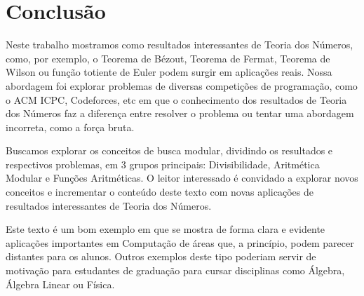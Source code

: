 
\chapter{Conclusão} %

\label{Chapter5} %


Neste trabalho mostramos como resultados interessantes de Teoria dos
Números, como, por exemplo, o Teorema de Bézout,  Teorema de Fermat,
Teorema de Wilson ou função totiente de Euler podem surgir em
aplicações reais. Nossa abordagem foi explorar problemas de diversas
competições de programação, como o ACM ICPC, Codeforces, etc  em que o
conhecimento dos resultados de Teoria dos Números faz a diferença
entre resolver o problema ou tentar uma abordagem incorreta, como a
força bruta.

Buscamos explorar os conceitos de busca modular, dividindo os
resultados e respectivos problemas, em 3 grupos principais:
Divisibilidade, Aritmética Modular e Funções Aritméticas. O leitor
interessado é convidado a explorar novos conceitos e incrementar o
conteúdo deste texto com novas aplicações de resultados interessantes
de Teoria dos Números.

Este texto é um bom exemplo em que se mostra de forma clara e evidente
aplicações importantes em Computação de áreas que, a princípio, podem
parecer distantes para os alunos. Outros exemplos deste tipo poderiam
servir de motivação para estudantes de graduação para cursar
disciplinas como Álgebra, Álgebra Linear ou Física.




